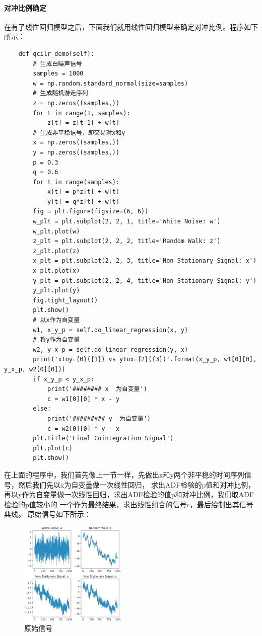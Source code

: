 \documentclass{article}
\begin{document}
\paragraph{对冲比例确定}
在有了线性回归模型之后，下面我们就用线性回归模型来确定对冲比例。程序如下所示：
\begin{lstlisting}
    def qcilr_demo(self):
        # 生成白噪声信号
        samples = 1000
        w = np.random.standard_normal(size=samples)
        # 生成随机游走序列
        z = np.zeros((samples,))
        for t in range(1, samples):
            z[t] = z[t-1] + w[t]
        # 生成非平稳信号，即交易对x和y
        x = np.zeros((samples,))
        y = np.zeros((samples,))
        p = 0.3
        q = 0.6
        for t in range(samples):
            x[t] = p*z[t] + w[t]
            y[t] = q*z[t] + w[t]
        fig = plt.figure(figsize=(6, 6))
        w_plt = plt.subplot(2, 2, 1, title='White Noise: w')
        w_plt.plot(w)
        z_plt = plt.subplot(2, 2, 2, title='Random Walk: z')
        z_plt.plot(z)
        x_plt = plt.subplot(2, 2, 3, title='Non Stationary Signal: x')
        x_plt.plot(x)
        y_plt = plt.subplot(2, 2, 4, title='Non Stationary Signal: y')
        y_plt.plot(y)
        fig.tight_layout()
        plt.show()
        # 以x作为自变量
        w1, x_y_p = self.do_linear_regression(x, y)
        # 将y作为自变量
        w2, y_x_p = self.do_linear_regression(y, x)
        print('xToy={0}({1}) vs yTox={2}({3})'.format(x_y_p, w1[0][0], y_x_p, w2[0][0]))
        if x_y_p < y_x_p:
            print('######## x  为自变量')
            c = w1[0][0] * x - y
        else:
            print('######### y  为自变量')
            c = w2[0][0] * y - x
        plt.title('Final Cointegration Signal')
        plt.plot(c)
        plt.show()
\end{lstlisting}
在上面的程序中，我们首先像上一节一样，先做出x和y两个非平稳的时间序列信号，然后我们先以x为自变量做一次线性回归，
求出ADF检验的p值和对冲比例，再以y作为自变量做一次线性回归，求出ADF检验的值p和对冲比例，我们取ADF检验的p值较小的
一个作为最终结果，求出线性组合的信号c，最后绘制出其信号典线。\newline
原始信号如下所示：
\begin{figure}[H]
	\caption{原始信号}
	\label{f000049}
	\centering
	\includegraphics[height=5cm]{images/f000049}
\end{figure}
\end{document}
